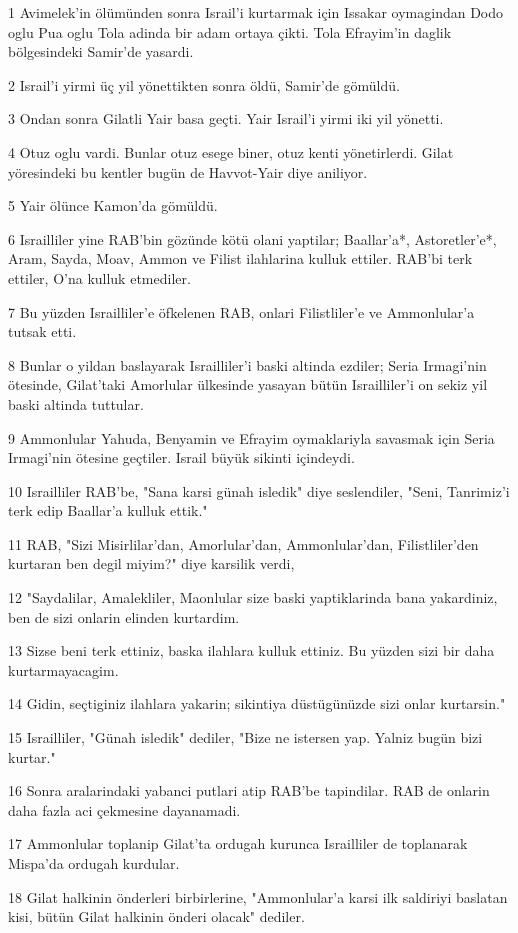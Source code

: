 \par 1 Avimelek'in ölümünden sonra Israil'i kurtarmak için Issakar oymagindan Dodo oglu Pua oglu Tola adinda bir adam ortaya çikti. Tola Efrayim'in daglik bölgesindeki Samir'de yasardi.
\par 2 Israil'i yirmi üç yil yönettikten sonra öldü, Samir'de gömüldü.
\par 3 Ondan sonra Gilatli Yair basa geçti. Yair Israil'i yirmi iki yil yönetti.
\par 4 Otuz oglu vardi. Bunlar otuz esege biner, otuz kenti yönetirlerdi. Gilat yöresindeki bu kentler bugün de Havvot-Yair diye aniliyor.
\par 5 Yair ölünce Kamon'da gömüldü.
\par 6 Israilliler yine RAB'bin gözünde kötü olani yaptilar; Baallar'a*, Astoretler'e*, Aram, Sayda, Moav, Ammon ve Filist ilahlarina kulluk ettiler. RAB'bi terk ettiler, O'na kulluk etmediler.
\par 7 Bu yüzden Israilliler'e öfkelenen RAB, onlari Filistliler'e ve Ammonlular'a tutsak etti.
\par 8 Bunlar o yildan baslayarak Israilliler'i baski altinda ezdiler; Seria Irmagi'nin ötesinde, Gilat'taki Amorlular ülkesinde yasayan bütün Israilliler'i on sekiz yil baski altinda tuttular.
\par 9 Ammonlular Yahuda, Benyamin ve Efrayim oymaklariyla savasmak için Seria Irmagi'nin ötesine geçtiler. Israil büyük sikinti içindeydi.
\par 10 Israilliler RAB'be, "Sana karsi günah isledik" diye seslendiler, "Seni, Tanrimiz'i terk edip Baallar'a kulluk ettik."
\par 11 RAB, "Sizi Misirlilar'dan, Amorlular'dan, Ammonlular'dan, Filistliler'den kurtaran ben degil miyim?" diye karsilik verdi,
\par 12 "Saydalilar, Amalekliler, Maonlular size baski yaptiklarinda bana yakardiniz, ben de sizi onlarin elinden kurtardim.
\par 13 Sizse beni terk ettiniz, baska ilahlara kulluk ettiniz. Bu yüzden sizi bir daha kurtarmayacagim.
\par 14 Gidin, seçtiginiz ilahlara yakarin; sikintiya düstügünüzde sizi onlar kurtarsin."
\par 15 Israilliler, "Günah isledik" dediler, "Bize ne istersen yap. Yalniz bugün bizi kurtar."
\par 16 Sonra aralarindaki yabanci putlari atip RAB'be tapindilar. RAB de onlarin daha fazla aci çekmesine dayanamadi.
\par 17 Ammonlular toplanip Gilat'ta ordugah kurunca Israilliler de toplanarak Mispa'da ordugah kurdular.
\par 18 Gilat halkinin önderleri birbirlerine, "Ammonlular'a karsi ilk saldiriyi baslatan kisi, bütün Gilat halkinin önderi olacak" dediler.

